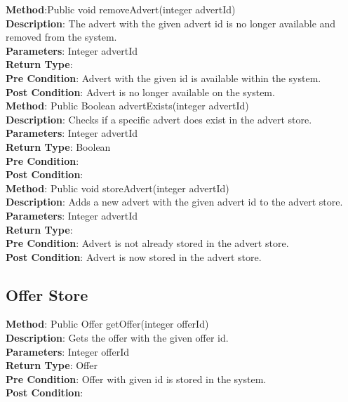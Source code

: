 \documentclass{l3deliverable}
\begin{document}
\textbf{Method}:Public void removeAdvert(integer advertId)\\
\textbf{Description}: The advert with the given advert id is no longer available and removed from the system.\\
\textbf{Parameters}: Integer advertId\\
\textbf{Return Type}: \\
\textbf{Pre Condition}: Advert with the given id is available within the system.\\
\textbf{Post Condition}: Advert is no longer available on the system.\\

\textbf{Method}: Public Boolean advertExists(integer advertId)\\
\textbf{Description}: Checks if a specific advert does exist in the advert store.\\
\textbf{Parameters}: Integer advertId\\
\textbf{Return Type}: Boolean\\
\textbf{Pre Condition}:\\
\textbf{Post Condition}:\\

\textbf{Method}: Public void storeAdvert(integer advertId)\\
\textbf{Description}: Adds a new advert with the given advert id to the advert store. \\
\textbf{Parameters}: Integer advertId\\
\textbf{Return Type}: \\
\textbf{Pre Condition}: Advert is not already stored in the advert store.\\
\textbf{Post Condition}: Advert is now stored in the advert store.\\

\subsection{Offer Store}

\textbf{Method}: Public Offer getOffer(integer offerId)\\ 
\textbf{Description}: Gets the offer with the given offer id. \\
\textbf{Parameters}: Integer offerId\\
\textbf{Return Type}: Offer\\
\textbf{Pre Condition}: Offer with given id is stored in the system.\\
\textbf{Post Condition}:\\
\end{document}
